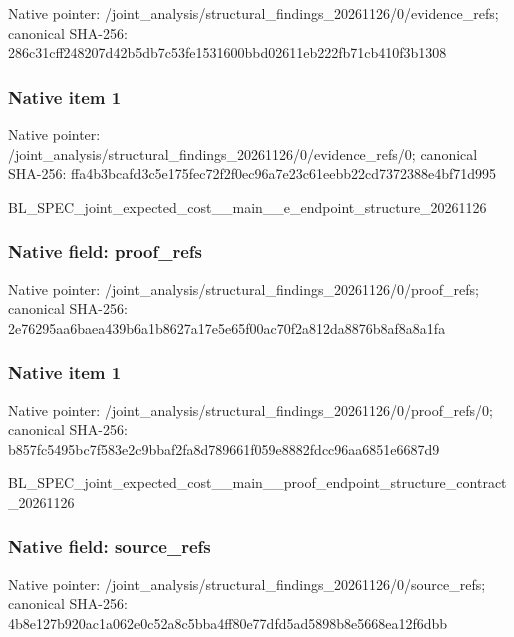 \documentclass[10pt,a4paper]{article}
\begin{document}
Native pointer: /joint\_analysis/structur\allowbreak{}al\_findings\_20261126/0/e\allowbreak{}vidence\_refs; canonical SHA-256: 286c31cff248207d42b5db7c\allowbreak{}53fe1531600bbd02611eb222\allowbreak{}fb71cb410f3b1308



\subsubsection{Native item 1}


Native pointer: /joint\_analysis/structur\allowbreak{}al\_findings\_20261126/0/e\allowbreak{}vidence\_refs/0; canonical SHA-256: ffa4b3bcafd3c5e175fec72f\allowbreak{}2f0ec96a7e23c61eebb22cd7\allowbreak{}372388e4bf71d995


BL\_SPEC\_joint\_expected\_c\allowbreak{}ost\_\_main\_\_e\_endpoint\_st\allowbreak{}ructure\_20261126


\subsubsection{Native field: proof\_refs}


Native pointer: /joint\_analysis/structur\allowbreak{}al\_findings\_20261126/0/p\allowbreak{}roof\_refs; canonical SHA-256: 2e76295aa6baea439b6a1b86\allowbreak{}27a17e5e65f00ac70f2a812d\allowbreak{}a8876b8af8a8a1fa



\subsubsection{Native item 1}


Native pointer: /joint\_analysis/structur\allowbreak{}al\_findings\_20261126/0/p\allowbreak{}roof\_refs/0; canonical SHA-256: b857fc5495bc7f583e2c9bba\allowbreak{}f2fa8d789661f059e8882fdc\allowbreak{}c96aa6851e6687d9


BL\_SPEC\_joint\_expected\_c\allowbreak{}ost\_\_main\_\_proof\_endpoin\allowbreak{}t\_structure\_contract\_202\allowbreak{}61126


\subsubsection{Native field: source\_refs}


Native pointer: /joint\_analysis/structur\allowbreak{}al\_findings\_20261126/0/s\allowbreak{}ource\_refs; canonical SHA-256: 4b8e127b920ac1a062e0c52a\allowbreak{}8c5bba4ff80e77dfd5ad5898\allowbreak{}b8e5668ea12f6dbb
\end{document}
